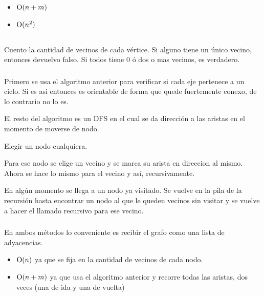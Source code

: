\begin{itemize}
\item $\operatorname{O}(n + m)$
\item $\operatorname{O}(n^2)$
\end{itemize}

\subsection{}

\subsubsection{}
Cuento la cantidad de vecinos de cada vértice. Si alguno tiene un único vecino, entonces devuelvo falso. Si todos tiene 0 ó dos o mas vecinos, es verdadero.

\subsubsection{}
Primero se usa el algoritmo anterior para verificar si cada eje pertenece a un ciclo. Si es asi entonces es orientable de forma que quede fuertemente conexo, de lo contrario no lo es.

El resto del algoritmo es un DFS en el cual se da dirección a las aristas en el momento de moverse de nodo.

Elegir un nodo cualquiera.

Para ese nodo se elige un vecino y se marca su arista en direccion al mismo. Ahora se hace lo mismo para el vecino y así, recursivamente.

En algún momento se llega a un nodo ya visitado. Se vuelve en la pila de la recursión hasta encontrar un nodo al que le queden vecinos sin visitar y se vuelve a hacer el llamado recursivo para ese vecino.

\subsubsection{}
En ambos métodos lo conveniente es recibir el grafo como una lista de adyacencias.

\begin{itemize}
\item $\operatorname{O}(n)$ ya que se fija en la cantidad de vecinos de cada nodo.
\item $\operatorname{O}(n + m)$ ya que usa el algoritmo anterior y recorre todas las aristas, dos veces (una de ida y una de vuelta)
\end{itemize}

